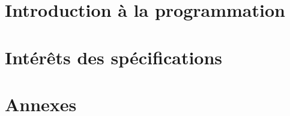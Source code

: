 \documentclass[12pt,a4paper,openany]{book}
\begin{document}
	\setcounter{tocdepth}{1}
	\setcounter{secnumdepth}{3}
	\maketitle
	\tableofcontents
	\part{Introduction à la programmation}
	
	
	
	\part{Intérêts des spécifications}
	
	
	
	
	\appendix
	\part{Annexes}
	
	
\end{document}
